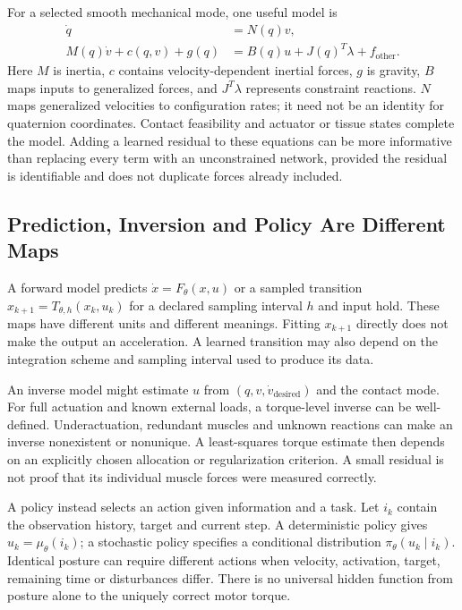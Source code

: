 For a selected smooth mechanical mode, one useful model is
\begin{equation}
\begin{aligned}
\dot q&=N(q)v,\\
M(q)\dot v+c(q,v)+g(q)&=B(q)u+J(q)^T\lambda+f_{\mathrm{other}}.
\end{aligned}
\end{equation}
Here $M$ is inertia, $c$ contains velocity-dependent inertial forces, $g$ is gravity, $B$ maps inputs to generalized forces, and $J^T\lambda$ represents constraint reactions. $N$ maps generalized velocities to configuration rates; it need not be an identity for quaternion coordinates. Contact feasibility and actuator or tissue states complete the model. Adding a learned residual to these equations can be more informative than replacing every term with an unconstrained network, provided the residual is identifiable and does not duplicate forces already included.

\subsection{Prediction, Inversion and Policy Are Different Maps}

A forward model predicts $\dot x=F_\theta(x,u)$ or a sampled transition $x_{k+1}=T_{\theta,h}(x_k,u_k)$ for a declared sampling interval $h$ and input hold. These maps have different units and different meanings. Fitting $x_{k+1}$ directly does not make the output an acceleration. A learned transition may also depend on the integration scheme and sampling interval used to produce its data.

An inverse model might estimate $u$ from $(q,v,\dot v_{\mathrm{desired}})$ and the contact mode. For full actuation and known external loads, a torque-level inverse can be well-defined. Underactuation, redundant muscles and unknown reactions can make an inverse nonexistent or nonunique. A least-squares torque estimate then depends on an explicitly chosen allocation or regularization criterion. A small residual is not proof that its individual muscle forces were measured correctly.

A policy instead selects an action given information and a task. Let $i_k$ contain the observation history, target and current step. A deterministic policy gives $u_k=\mu_\theta(i_k)$; a stochastic policy specifies a conditional distribution $\pi_\theta(u_k\mid i_k)$. Identical posture can require different actions when velocity, activation, target, remaining time or disturbances differ. There is no universal hidden function from posture alone to the uniquely correct motor torque.

